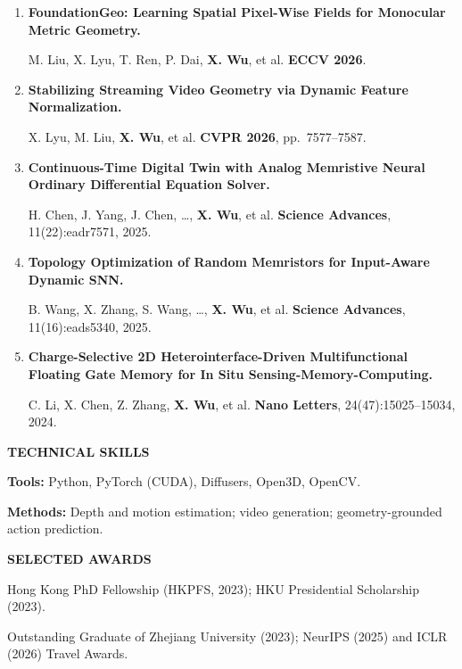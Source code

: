 \documentclass[a4paper]{article}
\newcommand{\cvsection}[1]{%
  \par\vspace{2.0pt}%
  {\color{cvblue}\fontsize{11}{12.2}\selectfont\bfseries\MakeUppercase{#1}}\par
  \vspace{-4pt}{\color{cvblue}\rule{\textwidth}{0.4pt}}\par\vspace{1.0pt}%
}
\begin{document}
{\begin{enumerate}[resume,leftmargin=1.6em,labelsep=0.38em,itemsep=0.4pt,topsep=1.3pt,parsep=0pt,partopsep=0pt]
M. Liu, T. Liu, J. Xia, X. Lyu, \textbf{X. Wu}, et al. \hfill \textbf{CoRL 2026}.
\item \textbf{FoundationGeo: Learning Spatial Pixel-Wise Fields for Monocular Metric Geometry.}\par
M. Liu, X. Lyu, T. Ren, P. Dai, \textbf{X. Wu}, et al. \hfill \textbf{ECCV 2026}.
\item \textbf{Stabilizing Streaming Video Geometry via Dynamic Feature Normalization.}\par
X. Lyu, M. Liu, \textbf{X. Wu}, et al. \hfill \textbf{CVPR 2026}, pp.\ 7577--7587.
\item \textbf{Continuous-Time Digital Twin with Analog Memristive Neural Ordinary Differential Equation Solver.}\par
H. Chen, J. Yang, J. Chen, \ldots, \textbf{X. Wu}, et al. \hfill \textbf{Science Advances}, 11(22):eadr7571, 2025.
\item \textbf{Topology Optimization of Random Memristors for Input-Aware Dynamic SNN.}\par
B. Wang, X. Zhang, S. Wang, \ldots, \textbf{X. Wu}, et al. \hfill \textbf{Science Advances}, 11(16):eads5340, 2025.
\item \textbf{Charge-Selective 2D Heterointerface-Driven Multifunctional Floating Gate Memory for In Situ Sensing-Memory-Computing.}\par
C. Li, X. Chen, Z. Zhang, \textbf{X. Wu}, et al. \hfill \textbf{Nano Letters}, 24(47):15025--15034, 2024.
\end{enumerate}}

\cvsection{Technical Skills}
\textbf{Tools:} Python, PyTorch (CUDA), Diffusers, Open3D, OpenCV.\par
\textbf{Methods:} Depth and motion estimation; video generation; geometry-grounded action prediction.


\cvsection{Selected Awards}
Hong Kong PhD Fellowship (HKPFS, 2023); HKU Presidential Scholarship (2023).\par
Outstanding Graduate of Zhejiang University (2023); NeurIPS (2025) and ICLR (2026) Travel Awards.
\end{document}
